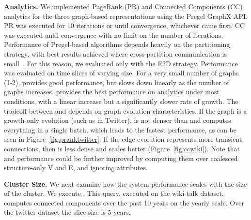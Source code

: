 {\bf Analytics.}  We implemented PageRank (PR) and Connected
Components (CC) analytics for the three graph-based representations
using the Pregel GraphX API.  PR was executed for 10 iterations or
until convergence, whichever came first. CC was executed until
convergence with no limit on the number of iterations.  Performance of
Pregel-based algorithms depends heavily on the partitioning strategy,
with best results achieved where cross-partition communication is
small~\cite{MoffittTempWeb16}.  For this reason, we evaluated only
with the E2D strategy.
%
Performance was evaluated on time slices of varying size.  For a very
small number of graphs (1-2), \sg provides good performance, but slows
down linearly as the number of graphs increases.  \hg provides the
best performance on analytics under most conditions, with a linear
increase but a significantly slower rate of growth.  The tradeoff
between \og and \hg depends on graph evolution characteristics.  If
the graph is a growth-only evolution (such as in Twitter), \og is not
denser than \hg and computes everything in a single batch, which leads
to the fastest performance, as can be seen in
Figure~\ref{fig:pranktwitter}.  If the edge evolution represents more
transient connections, then \hg is less dense and scales better
(Figure~\ref{fig:ccwiki}).  Note that \og and \hg performance could be
further improved by computing them over coalesced structure-only V and
E, and ignoring attributes.

{\bf Cluster Size.}  We next examine how the system performance scales
with the size of the cluster.  We execute
.
%
This query, executed on the wiki-talk dataset, computes connected
components over the past 10 years on the yearly scale.  Over the
twitter dataset the slice size is 5 years.


